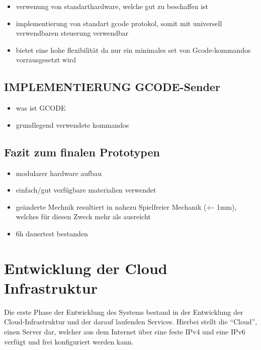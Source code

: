 \begin{itemize}
\tightlist
\item
  verwenung von standarthardware, welche gut zu beschaffen ist
\item
  implementierung von standart gcode protokol, somit mit universell
  verwendbaren steuerung verwendbar
\item
  bietet eine hohe flexibilität da nur ein minimales set von
  Gcode-kommandos vorrausgesetzt wird
\end{itemize}

\hypertarget{implementierung-gcode-sender}{%
\subsection{IMPLEMENTIERUNG
GCODE-Sender}\label{implementierung-gcode-sender}}

\begin{itemize}
\tightlist
\item
  was ist GCODE
\item
  grundlegend verwendete kommandos
\end{itemize}

\hypertarget{fazit-zum-finalen-prototypen}{%
\subsection{Fazit zum finalen
Prototypen}\label{fazit-zum-finalen-prototypen}}

\begin{itemize}
\tightlist
\item
  modularer hardware aufbau
\item
  einfach/gut verfügbare materialien verwendet
\item
  geänderte Mechnik resultiert in nahezu Spielfreier Mechanik (+- 1mm),
  welches für diesen Zweck mehr als ausreicht
\item
  6h dauertest bestanden
\end{itemize}

\hypertarget{entwicklung-der-cloud-infrastruktur}{%
\section{Entwicklung der Cloud
Infrastruktur}\label{entwicklung-der-cloud-infrastruktur}}

Die erste Phase der Entwicklung des Systems bestand in der Entwicklung
der Cloud-Infrastruktur und der darauf laufenden Services. Hierbei
stellt die ``Cloud'', einen Server dar, welcher aus dem Internet über
eine feste IPv4 und eine IPv6 verfügt und frei konfiguriert werden kann.

